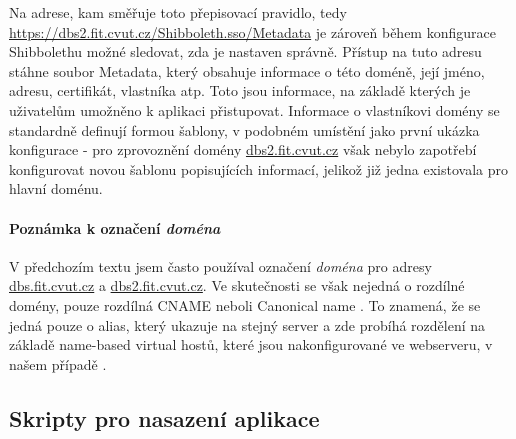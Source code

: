 Na adrese, kam směřuje toto přepisovací pravidlo, tedy \url{https://dbs2.fit.cvut.cz/Shibboleth.sso/Metadata} je zároveň během konfigurace Shibbolethu možné sledovat, zda je nastaven správně. Přístup na tuto adresu stáhne soubor Metadata, který obsahuje informace o této doméně, její jméno, adresu, certifikát, vlastníka atp. Toto jsou informace, na základě kterých je uživatelům umožněno k aplikaci přistupovat. Informace o vlastníkovi domény se standardně definují formou šablony, v podobném umístění jako první ukázka konfigurace - pro zprovoznění domény \url{dbs2.fit.cvut.cz} však nebylo zapotřebí konfigurovat novou šablonu popisujících informací, jelikož již jedna existovala pro hlavní doménu.

\paragraph{Poznámka k označení \emph{doména}}
V předchozím textu jsem často používal označení \emph{doména} pro adresy \url{dbs.fit.cvut.cz} a \url{dbs2.fit.cvut.cz}. Ve skutečnosti se však nejedná o rozdílné domény, pouze rozdílná CNAME neboli Canonical name \cite{dns}. To znamená, že se jedná pouze o alias, který ukazuje na stejný server a zde probíhá rozdělení na základě name-based virtual hostů, které jsou nakonfigurované ve webserveru, v našem případě .

\subsection{Skripty pro nasazení aplikace}

